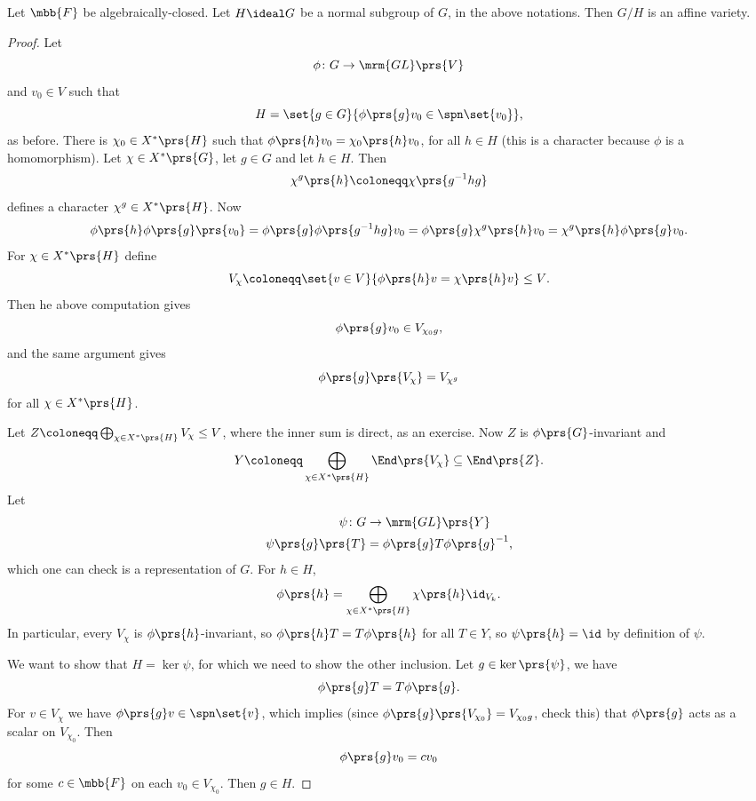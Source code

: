 \documentclass[10pt,a4paper,twoside,openany,hidelinks]{book}
\begin{document}
\begin{proposition}
Let $\mbb{F}$ be algebraically-closed. Let $H \ideal G$ be a normal subgroup of $G$, in the above notations. Then $G/H$ is an affine variety.
\end{proposition}

\begin{proof}
Let
\[\phi \colon G \to \mrm{GL}\prs{V}\]
and $v_0 \in V$ such that \[H = \set{g \in G}{\phi\prs{g} v_0 \in \spn\set{v_0}} \text{,}\]
as before.
There is $\chi_0 \in X^*\prs{H}$ such that $\phi\prs{h} v_0 = \chi_0\prs{h} v_0$, for all $h \in H$ (this is a character because $\phi$ is a homomorphism).
Let $\chi \in X^*\prs{G}$, let $g \in G$ and let $h \in H$. Then
\[\chi^g\prs{h} \coloneqq \chi\prs{g^{-1} h g}\]
defines a character $\chi^g \in X^*\prs{H}$.
Now
\[\phi\prs{h} \phi\prs{g} \prs{v_0} = \phi\prs{g} \phi\prs{g^{-1} h g} v_0 = \phi\prs{g} \chi^g\prs{h} v_0 = \chi^g\prs{h} \phi\prs{g} v_0 \text{.}\]
For $\chi \in X^*\prs{H}$ define
\[V_\chi \coloneqq \set{v \in V}{\phi\prs{h} v = \chi\prs{h} v} \leq V \text{.}\]
Then he above computation gives
\[\phi\prs{g} v_0 \in V_{\chi_0 g} \text{,}\]
and the same argument gives
\[\phi\prs{g}\prs{V_\chi} = V_{\chi^g}\]
for all $\chi \in X^*\prs{H}$.

Let $Z \coloneqq \bigoplus_{\chi \in X^*\prs{H}} V_\chi \leq V$, where the inner sum is direct, as an exercise.
Now $Z$ is $\phi\prs{G}$-invariant and
\[Y \coloneqq \bigoplus_{\chi \in X^*\prs{H}} \End\prs{V_\chi} \subseteq \End\prs{Z} \text{.}\]
Let
\begin{align*}
\psi \colon G &\to \mrm{GL}\prs{Y} \\
\psi\prs{g}\prs{T} &= \phi\prs{g} T \phi\prs{g}^{-1} \text{,}
\end{align*}
which one can check is a representation of $G$.
For $h \in H$,
\begin{align*}
\phi\prs{h} = \bigoplus_{\chi \in X^*\prs{H}} \chi\prs{h} \id_{V_k} \text{.}
\end{align*}
In particular, every $V_\chi$ is $\phi\prs{h}$-invariant, so $\phi\prs{h} T = T \phi\prs{h}$ for all $T \in Y$, so $\psi\prs{h} = \id$ by definition of $\psi$.

We want to show that $H = \ker\psi$, for which we need to show the other inclusion. Let $g \in \ker\prs{\psi}$, we have
\[\phi\prs{g} T = T \phi\prs{g} \text{.}\]
For $v \in V_\chi$ we have $\phi\prs{g} v \in \spn\set{v}$, which implies (since $\phi\prs{g} \prs{V_{\chi_0}} = V_{\chi_0 g}$, check this) that $\phi\prs{g}$ acts as a scalar on $V_{\chi_0}$. Then
\[\phi\prs{g} v_0 = c v_0\]
for some $c \in \mbb{F}$ on each $v_0 \in V_{\chi_0}$. Then $g \in H$.
\end{proof}
\end{document}
